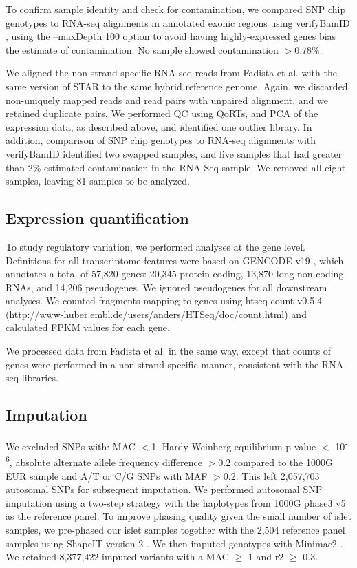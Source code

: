 To confirm sample identity and check for contamination, we compared SNP chip genotypes to RNA-seq alignments in annotated exonic regions using verifyBamID \cite{junDetectingEstimatingContamination2012}, using the --maxDepth 100 option to avoid having highly-expressed genes bias the estimate of contamination. No sample showed contamination $>$0.78\%.

We aligned the non-strand-specific RNA-seq reads from Fadista et al. \cite{fadistaGlobalGenomicTranscriptomic2014} with the same version of STAR to the same hybrid reference genome. Again, we discarded non-uniquely mapped reads and read pairs with unpaired alignment, and we retained duplicate pairs. We performed QC using QoRTs, and PCA of the expression data, as described above, and identified one outlier library.  In addition, comparison of SNP chip genotypes to RNA-seq alignments with verifyBamID identified two swapped samples, and five samples that had greater than 2\% estimated contamination in the RNA-Seq sample. We removed all eight samples, leaving 81 samples to be analyzed.

\subsection{Expression quantification}
To study regulatory variation, we performed analyses at the gene level. Definitions for all transcriptome features were based on GENCODE v19 \cite{harrowGENCODEReferenceHuman2012}, which annotates a total of 57,820 genes: 20,345 protein-coding, 13,870 long non-coding RNAs, and 14,206 pseudogenes. We ignored pseudogenes for all downstream analyses. We counted fragments mapping to genes using htseq-count v0.5.4 \cite{andersHTSeqPythonFramework2015} (\url{http://www-huber.embl.de/users/anders/HTSeq/doc/count.html}) and calculated FPKM values for each gene. 

We processed data from Fadista et al. in the same way, except that counts of genes were performed in a non-strand-specific manner, consistent with the RNA-seq libraries.

\subsection{Imputation} 
We excluded SNPs with: MAC $<$1, Hardy-Weinberg equilibrium p-value $<$ 10\textsuperscript{-6}, absolute alternate allele frequency difference $>$0.2 compared to the 1000G EUR sample and A/T or C/G SNPs with MAF $>$0.2.  This left 2,057,703 autosomal SNPs for subsequent imputation. We performed autosomal SNP imputation using a two-step strategy \cite{howieFastAccurateGenotype2012} with the haplotypes from 1000G phase3 v5 \cite{the1000genomesprojectconsortiumGlobalReferenceHuman2015a} as the reference panel. To improve phasing quality given the small number of islet samples, we pre-phased our islet samples together with the 2,504 reference panel samples using ShapeIT version 2 \cite{delaneauImprovedWholechromosomePhasing2013}. We then imputed genotypes with Minimac2 \cite{fuchsbergerMinimac2FasterGenotype2015}. We retained 8,377,422 imputed variants with a MAC $\geq$ 1 and r2 $\geq$ 0.3.

